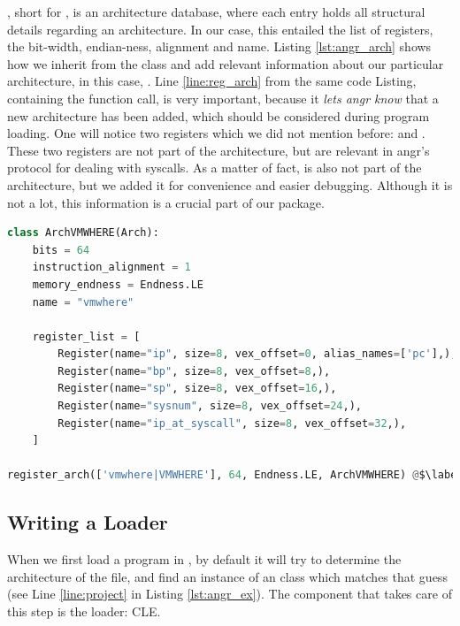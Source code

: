 , short for , is an architecture database, where each entry holds all structural details regarding an architecture. In our case, this entailed the list of registers, the bit-width, endian-ness, alignment and name. Listing \ref{lst:angr_arch} shows how we inherit from the  class and add relevant information about our particular architecture, in this case, . Line \ref{line:reg_arch} from the same code Listing, containing the  function call, is very important, because it \emph{lets angr know} that a new architecture has been added, which should be considered during program loading. One will notice two registers which we did not mention before:  and . These two registers are not part of the architecture, but are relevant in angr's protocol for dealing with \glspl{syscall}. As a matter of fact,  is also not part of the architecture, but we added it for convenience and easier debugging. Although it is not a lot, this information is a crucial part of our package.

\begin{lstlisting}[language=python, label={lst:angr_arch}, caption={Implementation of an Archinfo module extension for the \cc{vmwhere} sample. A list of registers, bit-width, endian-ness and module name are explicitly specified.}]
class ArchVMWHERE(Arch):
    bits = 64
    instruction_alignment = 1
    memory_endness = Endness.LE
    name = "vmwhere"

    register_list = [
        Register(name="ip", size=8, vex_offset=0, alias_names=['pc'],),
        Register(name="bp", size=8, vex_offset=8,),
        Register(name="sp", size=8, vex_offset=16,),
        Register(name="sysnum", size=8, vex_offset=24,),
        Register(name="ip_at_syscall", size=8, vex_offset=32,),
    ]

register_arch(['vmwhere|VMWHERE'], 64, Endness.LE, ArchVMWHERE) @$\label{line:reg_arch}$@
\end{lstlisting}

\subsection{Writing a Loader}

When we first load a program in , by default it will try to determine the architecture of the file, and find an instance of an  class which matches that guess (see Line \ref{line:project} in Listing \ref{lst:angr_ex}). The component that takes care of this step is the loader: \gls{CLE}. 


